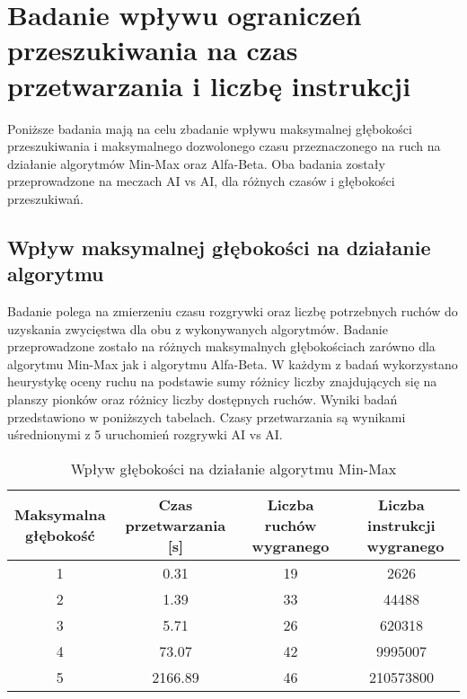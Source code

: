 \documentclass[a4paper,10pt]{article}
\begin{document}
    \section{Badanie wpływu ograniczeń przeszukiwania na czas przetwarzania i liczbę instrukcji}
    Poniższe badania mają na celu zbadanie wpływu maksymalnej głębokości przeszukiwania i maksymalnego dozwolonego czasu przeznaczonego na ruch na działanie algorytmów Min-Max oraz Alfa-Beta. Oba badania zostały przeprowadzone na meczach AI vs AI, dla różnych czasów i głębokości przeszukiwań. 
    \justify
    \subsection{Wpływ maksymalnej głębokości na działanie algorytmu}
    Badanie polega na zmierzeniu czasu rozgrywki oraz liczbę potrzebnych ruchów do uzyskania zwycięstwa dla obu z wykonywanych algorytmów. Badanie przeprowadzone zostało na różnych maksymalnych głębokościach zarówno dla algorytmu Min-Max jak i algorytmu Alfa-Beta. W każdym z badań wykorzystano heurystykę oceny ruchu na podstawie sumy różnicy liczby znajdujących się na planszy pionków oraz różnicy liczby dostępnych ruchów. Wyniki badań przedstawiono w poniższych tabelach. Czasy przetwarzania są wynikami uśrednionymi z 5 uruchomień rozgrywki AI vs AI.
    
    \begin{table}[H]
    \caption{Wpływ głębokości na działanie algorytmu Min-Max}
    \label{minmax_depth}
    \begin{center}
    \begin{tabular}{|c|c|c|c|} 
    \hline
    \thead{Maksymalna \\ głębokość} & \thead{Czas \\ przetwarzania [s]} & \thead{Liczba ruchów  \\ wygranego} & \thead{Liczba instrukcji \\\ wygranego} \\
    \hline
    {1} & \makecell{}0.31 & \makecell{}19 & \makecell{}2626 \\
    \hline
    {2} & \makecell{}1.39 & \makecell{}33 & \makecell{}44488 \\ 
    \hline
    {3} & \makecell{}5.71 & \makecell{}26 & \makecell{}620318 \\ 
    \hline
    {4} & \makecell{}73.07 & \makecell{}42 & \makecell{}9995007 \\ 
    \hline
    {5} & \makecell{}2166.89 & \makecell{}46 & \makecell{}210573800 \\ 
    \hline
    \end{tabular}
    \end{center}
     \end{table}
    
\end{document}
